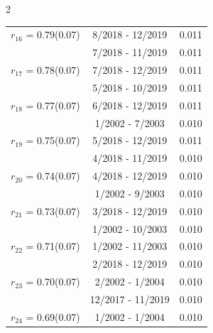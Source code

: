 \begin{multicols}{2}
{\begin{tabular}{ccc}
  $r_{16}$ = 0.79(0.07) &       8/2018 - 12/2019 &        0.011   \vspace{-.10in} \\  
&        7/2018 - 11/2019 &        0.011  \vspace{-.02in} \\ \hline 
  $r_{17}$ = 0.78(0.07) &       7/2018 - 12/2019 &        0.011   \vspace{-.10in} \\  
&        5/2018 - 10/2019 &        0.011  \vspace{-.02in} \\ \hline 
  $r_{18}$ = 0.77(0.07) &       6/2018 - 12/2019 &        0.011   \vspace{-.10in} \\  
&        1/2002 -  7/2003 &        0.010  \vspace{-.02in} \\ \hline 
  $r_{19}$ = 0.75(0.07) &       5/2018 - 12/2019 &        0.011   \vspace{-.10in} \\  
&        4/2018 - 11/2019 &        0.010  \vspace{-.02in} \\ \hline 
  $r_{20}$ = 0.74(0.07) &       4/2018 - 12/2019 &        0.010   \vspace{-.10in} \\  
&        1/2002 -  9/2003 &        0.010  \vspace{-.02in} \\ \hline 
  $r_{21}$ = 0.73(0.07) &       3/2018 - 12/2019 &        0.010   \vspace{-.10in} \\  
&        1/2002 - 10/2003 &        0.010  \vspace{-.02in} \\ \hline 
  $r_{22}$ = 0.71(0.07) &       1/2002 - 11/2003 &        0.010   \vspace{-.10in} \\  
&        2/2018 - 12/2019 &        0.010  \vspace{-.02in} \\ \hline 
  $r_{23}$ = 0.70(0.07) &       2/2002 -  1/2004 &        0.010   \vspace{-.10in} \\  
&       12/2017 - 11/2019 &        0.010  \vspace{-.02in} \\ \hline 
  $r_{24}$ = 0.69(0.07) &       1/2002 -  1/2004 &        0.010   \vspace{-.10in} \\  

\end{tabular}}
\end{multicols}
